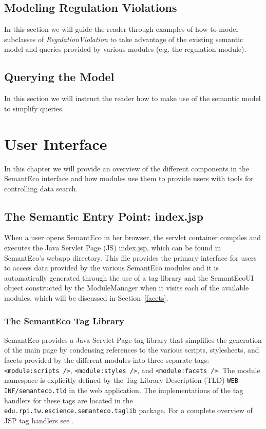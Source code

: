 \documentclass[letterpaper]{report}
\begin{document}
\section{Modeling Regulation Violations}
\label{regulation-violation}
In this section we will guide the reader through examples of how to model subclasses of \textit{RegulationViolation} to take advantage of the existing semantic model and queries provided by various modules (e.g. the regulation module).
\section{Querying the Model}
\label{querying}
In this section we will instruct the reader how to make use of the semantic model to simplify queries.


\chapter{User Interface}
\label{user-interface}
In this chapter we will provide an overview of the different components in the SemantEco interface and how modules use them to provide users with tools for controlling data search.

\section{The Semantic Entry Point: index.jsp}
\label{index.jsp}
When a user opens SemantEco in her browser, the servlet container compiles and executes the Java Servlet Page (JS) index.jsp, which can be found in SemantEco's webapp directory. This file provides the primary interface for users to access data provided by the various SemantEco modules and it is automatically generated through the use of a tag library and the SemantEcoUI object constructed by the ModuleManager when it visits each of the available modules, which will be discussed in Section~\ref{facets}.

\subsection{The SemantEco Tag Library}
SemantEco provides a Java Servlet Page tag library that simplifies the generation of the main page by condensing references to the various scripts, stylesheets, and facets provided by the different modules into three separate tags: \texttt{<module:scripts />}, \texttt{<module:styles />}, and \texttt{<module:facets />}. The module namespace is explicitly defined by the Tag Library Description (TLD) \texttt{WEB-INF/semanteco.tld} in the web application. The implementations of the tag handlers for these tags are located in the \texttt{edu.rpi.tw.escience.semanteco.taglib} package. For a complete overview of JSP tag handlers see \cite{JSPTagHandlers}.
\end{document}

